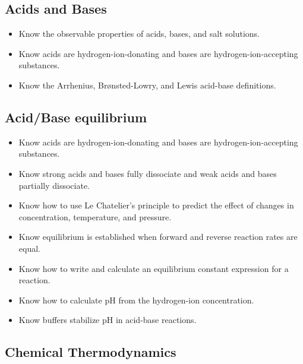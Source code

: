 \documentclass[11pt]{article}
\begin{document}
\subsection{Acids and Bases}
\label{sec:orge693d9c}

\begin{itemize}
\item Know the observable properties of acids, bases, and salt solutions.
\item Know acids are hydrogen-ion-donating and bases are hydrogen-ion-accepting substances.
\item Know the Arrhenius, Brønsted-Lowry, and Lewis acid-base definitions.
\end{itemize}
\subsection{Acid/Base equilibrium}
\label{sec:org2bb1f53}

\begin{itemize}
\item Know acids are hydrogen-ion-donating and bases are hydrogen-ion-accepting substances.
\item Know strong acids and bases fully dissociate and weak acids and bases partially dissociate.
\item Know how to use Le Chatelier's principle to predict the effect of changes in concentration, temperature, and pressure.
\item Know equilibrium is established when forward and reverse reaction rates are equal.
\item Know how to write and calculate an equilibrium constant expression for a reaction.
\item Know how to calculate pH from the hydrogen-ion concentration.
\item Know buffers stabilize pH in acid-base reactions.
\end{itemize}
\subsection{Chemical Thermodynamics}
\label{sec:orgf8c79cd}
\end{document}
